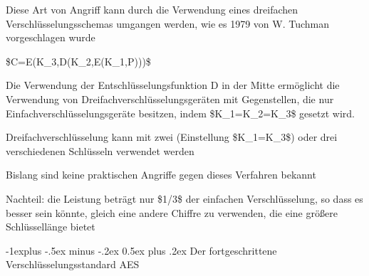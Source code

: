 \documentclass[a4paper]{article}
\makeatletter
\renewcommand{\subsection}{\@startsection{subsection}{2}{0mm}%
 {-1explus -.5ex minus -.2ex}%
 {0.5ex plus .2ex}%
 {\normalfont\normalsize\bfseries}}
\makeatother
\begin{document}
\begin{multicols}{3}
\begin{itemize*}
            \item Diese Art von Angriff kann durch die Verwendung eines dreifachen
            Verschlüsselungsschemas umgangen werden, wie es 1979 von W. Tuchman
            vorgeschlagen wurde
            \begin{itemize*}
                  \item \$C=E(K\_3,D(K\_2,E(K\_1,P)))\$
                  \item Die Verwendung der Entschlüsselungsfunktion D in der Mitte ermöglicht die Verwendung von Dreifachverschlüsselungsgeräten mit Gegenstellen, die nur Einfachverschlüsselungsgeräte besitzen, indem \$K\_1=K\_2=K\_3\$ gesetzt wird.
                  \item Dreifachverschlüsselung kann mit zwei (Einstellung \$K\_1=K\_3\$) oder drei verschiedenen Schlüsseln verwendet werden
                  \item Bislang sind keine praktischen Angriffe gegen dieses Verfahren bekannt
                  \item Nachteil: die Leistung beträgt nur \$1/3\$ der einfachen Verschlüsselung, so dass es besser sein könnte, gleich eine andere Chiffre zu verwenden, die eine größere Schlüssellänge bietet
            \end{itemize*}
      \end{itemize*}


      \subsection{Der fortgeschrittene Verschlüsselungsstandard
            AES}


\end{multicols}
\end{document}
